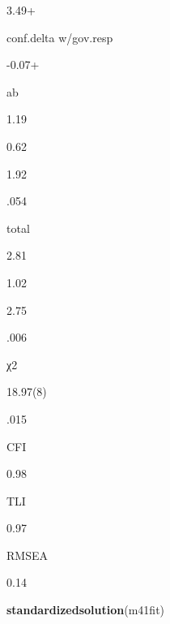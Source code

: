 \documentclass[
]{article}
\newenvironment{Shaded}{\begin{snugshade}}{\end{snugshade}}
\newcommand{\KeywordTok}[1]{\textcolor[rgb]{0.13,0.29,0.53}{\textbf{#1}}}
\newcommand{\NormalTok}[1]{#1}
\begin{document}
3.49+

conf.delta w/gov.resp

-0.07+

ab

1.19

0.62

1.92

.054

total

2.81

1.02

2.75

.006

χ2

18.97(8)

.015

CFI

0.98

TLI

0.97

RMSEA

0.14

\begin{Shaded}
\begin{Highlighting}[]
\KeywordTok{standardizedsolution}\NormalTok{(m41fit)}
\end{Highlighting}
\end{Shaded}
\end{document}
